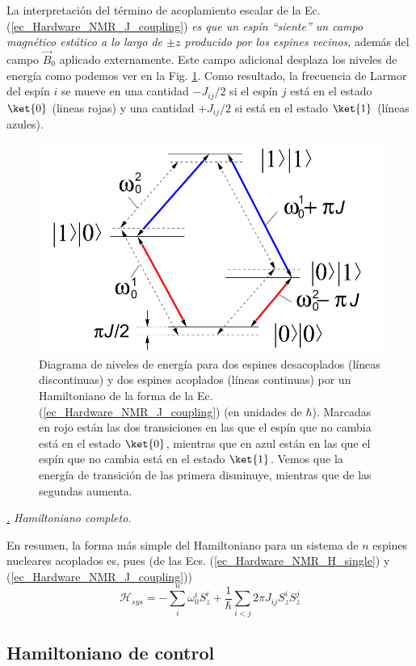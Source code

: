 \documentclass[a4paper,11pt]{book} %
\numberwithin{equation}{chapter}
\def\subsubiContadorIt{\par\addtocounter{subsubsection}{1}\underline{\it\thesubsubsection.}\hskip0.5cm \setcounter{subsubsubsectionIt}{0}}
\newcommand{\SubsubiIt}[1]{
		\subsubiContadorIt \textit{#1}
	}
\newcounter{subsubsubsectionIt}[subsubsection]
\begin{document}
\begin{itemize}
La interpretación del término de acoplamiento escalar de la Ec. (\ref{ec_Hardware_NMR_J_coupling})\textit{ es que un espín ``siente'' un campo magnético estático a lo largo de $\pm z$ producido por los espines vecinos}, además del campo $\vec{B}_0$ aplicado externamente. Este campo adicional desplaza los niveles de energía como podemos ver en la Fig. \ref{Fig_Harware_NMR_diagrama}. Como resultado, la frecuencia de Larmor del espín $i$ se mueve en una cantidad $-J_{ij}/2$ si el espín $j$ está en el estado $\ket{0}$ (lineas rojas) y una cantidad $+J_{ij}/2$ si está en el estado $\ket{1}$ (líneas azules).  

	\begin{figure}[H]
	\centering 
	\includegraphics[width=0.4\linewidth]{Figuras/Fig_Harware_NMR_diagrama}
	\caption{Diagrama de niveles de energía para dos espines desacoplados (líneas discontinuas) 
	y dos espines acoplados (líneas continuas) por un Hamiltoniano de la forma de la Ec.
	(\ref{ec_Hardware_NMR_J_coupling}) (en unidades de $\hbar$). Marcadas en rojo están las dos transiciones en las que el espín que no cambia está en el estado $\ket{0}$, mientras que en azul están en las que el espín que no cambia está en el estado $\ket{1}$. Vemos que la energía de transición de las primera disminuye, mientras que de las segundas aumenta.}
	\label{Fig_Harware_NMR_diagrama}
	\end{figure}

\end{itemize}

			\SubsubiIt{Hamiltoniano completo.}

En resumen, la forma más simple del Hamiltoniano para un sistema de $n$ espines nucleares acoplados es, pues (de las Ecs. (\ref{ec_Hardware_NMR_H_single}) y (\ref{ec_Hardware_NMR_J_coupling}))
	\begin{equation} \label{ec_Hardware_NMR_H_sys_final}
	\boxed{\mathcal{H}_{sys} = - \sum_{i}^n \omega_0^i S_z^{i}  + \frac{1}{\hbar} \sum_{i<j} 2 \pi J_{ij} S_z^i S_z^j}
	\end{equation}
	

		\subsection{Hamiltoniano de control} \label{sec_subsub_Harware_NMR_H_control}
\end{document}
